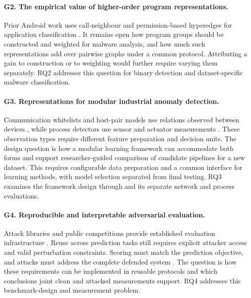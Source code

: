 \paragraph{G2. The empirical value of higher-order program representations.}\label{gap:2}
Prior Android work uses call-neighbour and permission-based hyperedges for application
classification \cite{zhang2023android}. It remains open how program groups should be
constructed and weighted for malware analysis, and how much such representations add over
pairwise graphs under a common protocol. Attributing a gain to construction or to
weighting would further require varying them separately. RQ2 addresses this question for
binary detection and dataset-specific malware classification.

\paragraph{G3. Representations for modular industrial anomaly detection.}\label{gap:3}
Communication whitelists and host-pair models use relations observed between devices
\cite{barbosa2013flow,yoon2014communication}, while process detectors use sensor and actuator
measurements \cite{goh2016swatdataset}. These observation types require different feature
preparation and decision units. The design question is how a modular learning framework can
accommodate both forms and support researcher-guided comparison of candidate pipelines for a
new dataset. This requires configurable data preparation and a common interface for learning
methods, with model selection separated from final testing. RQ3 examines the framework design
through \nadics{} and its separate network and process evaluations.

\paragraph{G4. Reproducible and interpretable adversarial evaluation.}\label{gap:4}
Attack libraries and public competitions provide established evaluation infrastructure
\cite{rauber2017foolbox,kurakin2018competition}. Reuse across prediction tasks still requires
explicit attacker access and valid perturbation constraints. Scoring must match the prediction
objective, and attacks must address the complete defended system
\cite{carlini2019evaluating}. The question is how these requirements can be implemented in
reusable protocols and which conclusions joint clean and attacked measurements support.
RQ4 addresses this benchmark-design and measurement problem.
